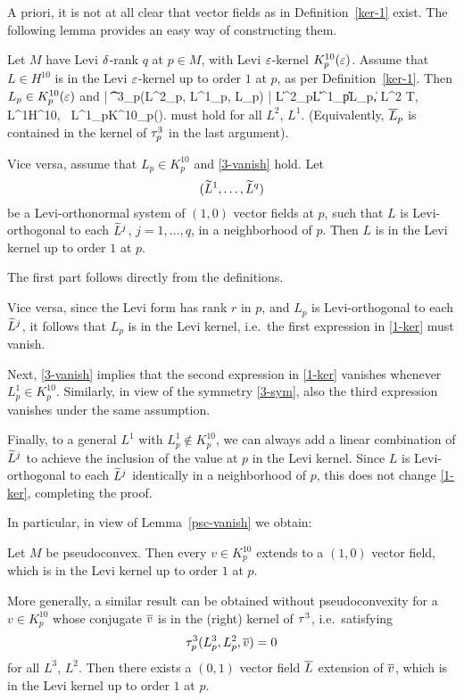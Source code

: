\documentclass[12pt]{amsart}
\begin{document}
A priori, it is not at all clear
that vector fields as in Definition~\ref{ker-1} exist.
The following lemma
provides an easy way of constructing them.


\bl{}
Let $M$ have Levi $\delta$-rank $q$ at $p\in M$,
with Levi $\varepsilon$-kernel $K^{10}_p(\varepsilon)$.
Assume that $L\in H^{10}$ is in the Levi $\varepsilon$-kernel
up to order $1$ at $p$,
as per Definition~\ref{ker-1}.
Then $L_p\in K^{10}_p(\varepsilon)$ and
\beq{}
	| \t^3_p(L^2_p, L^1_p, \1L_p) | 
	\le \e \|L^2_p\| \|L^1_p\| \|\1L_p\| ,
	\quad L^2 \in \C T, \, 
	L^1\in H^{10}, \,
	L^1_p\in K^{10}_p(\e).
\eeq
must hold for all $L^2$, $L^1$.
(Equivalently, $\overline{L}_p$ is contained in the kernel of $\tau^3_p$ in the last argument).

Vice versa, assume that $L_p\in K^{10}_p$ and 
\eqref{3-vanish} hold.
Let
$$(\widetilde{L}^1, \ldots, \widetilde{L}^q)$$
be a Levi-orthonormal system of 
$(1,0)$ vector fields at $p$,
such that $L$ is Levi-orthogonal to each $\widetilde{L}^j$, $j=1,\ldots,q$,
in a neighborhood of $p$.
Then $L$ is in the Levi kernel up to order $1$ at $p$.
\el


\bpf
The first part follows directly from the definitions.

Vice versa, since the Levi form has rank $r$ in $p$,
and $L_p$ is Levi-orthogonal to each $\widetilde{L}^j$,
it follows that $L_p$ is in the Levi kernel, i.e.\
the first expression in \eqref{1-ker} must vanish.

Next, \eqref{3-vanish}
implies that the second expression in \eqref{1-ker}
vanishes whenever $L^1_p\in K^{10}_p$.
Similarly, in view of the symmetry \eqref{3-sym},
also the third expression vanishes
under the same assumption.

Finally, to a general $L^1$ with $L^1_p\notin K^{10}_p$,
we can always add a linear combination of $\widetilde{L}^j$
to achieve the inclusion of the value at $p$ in the Levi kernel.
Since $L$ is Levi-orthogonal to each $\widetilde{L}^j$ identically in a neighborhood of $p$,
this does not change \eqref{1-ker},
completing the proof.
\epf

In particular, in view of Lemma~\ref{psc-vanish} we obtain:

\bc{}
Let $M$ be pseudoconvex.
Then every $v\in K^{10}_p$
extends to a $(1,0)$ vector field,
which is in the Levi kernel up to order $1$ at $p$.
\ec

\br
More generally, a similar result
can be obtained without pseudoconvexity
for a $v\in K^{10}_p$ 
whose conjugate $\overline{v}$ is in the (right) kernel of $\tau^3$, 
i.e.\ satisfying 
$$
	\tau^3_p(L^3_p, L^2_p, \overline{v}) = 0
$$
for all $L^3$, $L^2$.
Then there exists a $(0,1)$ vector field $\overline{L}$ extension of  $\overline{v}$,
which is in the Levi kernel up to order $1$ at $p$.
\er
\end{document}
